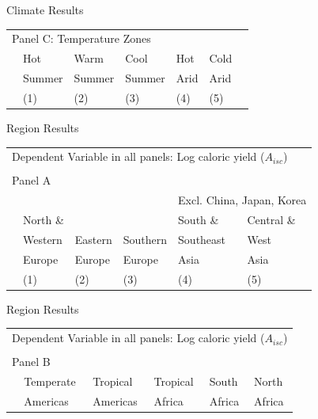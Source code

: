 \documentclass[10pt, xcolor=dvipsnames]{beamer}
\begin{document}
\begin{frame}{Climate Results}

{\footnotesize
\begin{tabularx}{\textwidth}{lXXXXXX}
\midrule
\multicolumn{7}{l}{Panel C: Temperature Zones} \\
    & Hot        & Warm        & Cool       & Hot      & Cold     &  \\
    & Summer & Summer & Summer & Arid & Arid &   \\
 & (1) & (2) & (3) & (4) & (5) &  \\    
\midrule

\midrule
\end{tabularx}
}
\end{frame}

\begin{frame}{Region Results}\label{subregiontab}

{\footnotesize
\begin{tabularx}{\textwidth}{lXXXXX}
\midrule
\multicolumn{6}{l}{Dependent Variable in all panels: Log caloric yield ($A_{isc}$)} \\ \\
\multicolumn{6}{l}{Panel A} \\
 &          &         &             &  \multicolumn{2}{c}{Excl. China, Japan, Korea} \\ \cmidrule(lr){5-6}
 & North \& &         &              & South \&  & Central \&             \\
 & Western  & Eastern & Southern     & Southeast & West        \\
 & Europe   & Europe  & Europe       & Asia      & Asia      \\
 & (1) & (2) & (3) & (4) & (5) \\
\midrule

\midrule
\end{tabularx}
}

\hfill \hyperlink{subregion}{}
\end{frame}

\begin{frame}{Region Results}

{\footnotesize
\begin{tabularx}{\textwidth}{lXXXXX}
\midrule
\multicolumn{6}{l}{Dependent Variable in all panels: Log caloric yield ($A_{isc}$)} \\ \\
\multicolumn{6}{l}{Panel B} \\
 & Temperate & Tropical  & Tropical & South    & North    \\
 & Americas  & Americas  & Africa   & Africa   & Africa     \\
\midrule

\midrule
\end{tabularx}
}

\end{frame}
\end{document}
